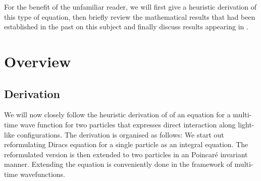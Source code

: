 \documentclass[b5paper,draft,openbib,12pt]{memoir}
\begin{document}
For the benefit of the unfamiliar reader, we will first give
a heuristic derivation of this type of equation, then 
briefly review 
the mathematical results that 
had been established in the past on this subject 
and finally 
discuss results appearing in \cite{selfDirac,selfKG}.






\section{Overview}
\subsection{Derivation}

We will now closely follow the  heuristic derivation of 
\cite{direct_interaction_quantum} 
of an equation for a multi-time wave function for two particles  
that expresses direct interaction along light-like configurations. 
The derivation is organised as follows: We start out 
reformulating Diracs equation
for a single particle 
as an integral equation. The reformulated version is then 
extended to  two particles
in an Poincaré invariant manner. Extending the 
equation is conveniently done in 
the framework of multi-time wavefunctions.
\end{document}
